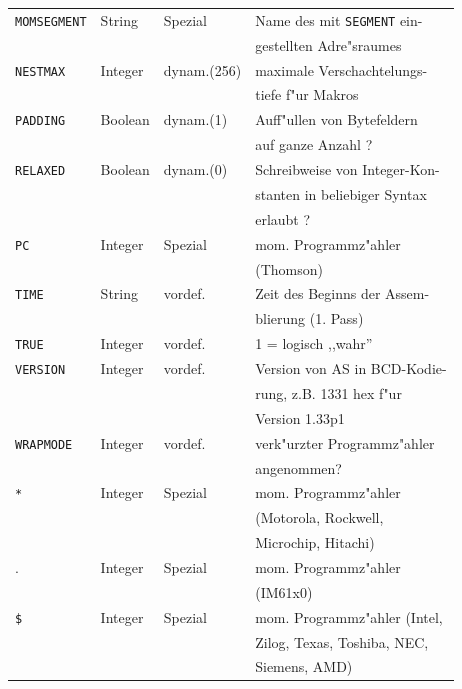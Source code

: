 \documentclass[12pt,a4paper,twoside]{report}
\newcommand{\tty}[1]{{\tt #1}}
\newcommand{\asname}{AS}
\begin{document}
\begin{center}
\begin{longtable}{|l|l|l|l|}
\hline
\tty{MOMSEGMENT} &  String     & Spezial    & Name des mit \tty{SEGMENT} ein- \\
                 &             &            & gestellten Adre"sraumes \\
\hline
\tty{NESTMAX}    &  Integer    & dynam.(256)& maximale Verschachtelungs- \\
                 &             &            & tiefe f"ur Makros \\
\hline
\tty{PADDING}    &  Boolean    & dynam.(1)  & Auff"ullen von Bytefeldern \\
                 &             &            & auf ganze Anzahl ? \\
\hline
\tty{RELAXED}    &  Boolean    & dynam.(0)  & Schreibweise von Integer-Kon- \\
                 &             &            & stanten in beliebiger Syntax \\
                 &             &            & erlaubt ? \\
\hline
\tty{PC}         &  Integer    & Spezial    & mom. Programmz"ahler \\
                 &             &            & (Thomson) \\
\hline
\tty{TIME}       &  String     & vordef.    & Zeit des Beginns der Assem- \\
                 &             &            & blierung (1. Pass) \\
\hline
\tty{TRUE}       &  Integer    & vordef.    & 1 = logisch ,,wahr'' \\
\hline
\tty{VERSION}    &  Integer    & vordef.    & Version von \asname{} in BCD-Kodie- \\
                 &             &            & rung, z.B. 1331 hex f"ur \\
                 &             &            & Version 1.33p1 \\
\hline
\tty{WRAPMODE}   &  Integer    & vordef.    & verk"urzter Programmz"ahler \\
                 &             &            & angenommen? \\
\hline
\verb!*!         &  Integer    & Spezial    & mom. Programmz"ahler \\
                 &             &            & (Motorola, Rockwell, \\
                 &             &            & Microchip, Hitachi) \\
\hline
.                &  Integer    & Spezial    & mom. Programmz"ahler \\
                 &             &            & (IM61x0) \\
\hline
\tty{\$}         &  Integer    & Spezial    & mom. Programmz"ahler (Intel, \\
                 &             &            & Zilog, Texas, Toshiba, NEC, \\
                 &             &            & Siemens, AMD) \\
\hline
\end{longtable}\end{center}
\end{document}
